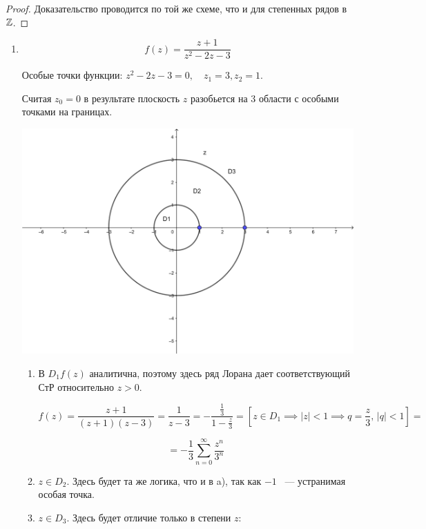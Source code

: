 \documentclass[../../main.tex]{subfiles}
\begin{document}
\begin{proof}
	Доказательство проводится по той же схеме, что и для степенных рядов в $\mathbb{Z}$.
\end{proof}

\begin{exmp}
	\begin{enumerate}
		\item \[ f(z) = \frac{z + 1}{z^2 - 2z - 3} \]
		
		Особые точки функции: $ z^2 - 2z - 3 = 0, \quad z_1 = 3, z_2 = 1 $.
		
		Считая $ z_0 = 0 $ в результате плоскость $z$ разобьется на 3 области с 
		особыми точками на границах.
		
		\begin{center}
			\includegraphics[scale = 0.65]{lec34_1} 
		\end{center}
		
		\begin{enumerate}
			\item В $ D_1 f(z) $ аналитична, поэтому здесь ряд Лорана дает 
			соответствующий СтР относительно $ z > 0 $.
			
			\[ f(z) = \frac{z + 1}{(z + 1)(z - 3)} = \frac{1}{z - 3} = 
			-\frac{\frac{1}{3}}{1 - \frac{z}{3}} = \left[ z \in D_1 \implies |z| < 1 
			\implies q = \frac{z}{3},\, |q| < 1 \right] = \]
			
			\[ = -\frac{1}{3} \sum\limits_{n = 0}^{\infty} \frac{z^n}{3^n} \]
			
			\item $ z \in D_2 $. Здесь будет та же логика, что и в a), так как $ -1 $ 
			~--- устранимая особая точка.
			
			\item $ z \in D_3 $. Здесь будет отличие только в степени $z$:
			

\end{enumerate}
\end{enumerate}
\end{exmp}
\end{document}
